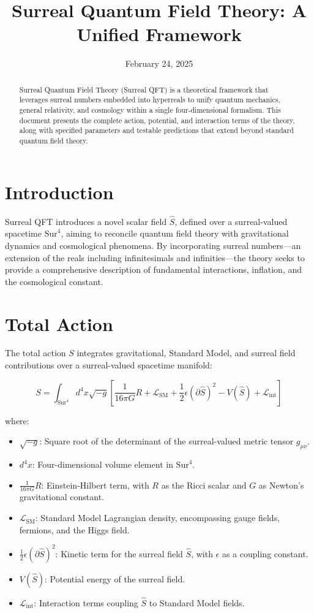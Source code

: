 \documentclass[a4paper,12pt]{article}
\title{Surreal Quantum Field Theory: A Unified Framework}
\author{}
\date{February 24, 2025}
\begin{document}
\maketitle

\begin{abstract}
    Surreal Quantum Field Theory (Surreal QFT) is a theoretical framework that leverages surreal numbers embedded into hyperreals to unify quantum mechanics, general relativity, and cosmology within a single four-dimensional formalism. This document presents the complete action, potential, and interaction terms of the theory, along with specified parameters and testable predictions that extend beyond standard quantum field theory.
\end{abstract}

\section{Introduction}
Surreal QFT introduces a novel scalar field \(\hat{S}\), defined over a surreal-valued spacetime \(\text{Sur}^4\), aiming to reconcile quantum field theory with gravitational dynamics and cosmological phenomena. By incorporating surreal numbers---an extension of the reals including infinitesimals and infinities---the theory seeks to provide a comprehensive description of fundamental interactions, inflation, and the cosmological constant.

\section{Total Action}
The total action \(S\) integrates gravitational, Standard Model, and surreal field contributions over a surreal-valued spacetime manifold:

\[
S = \int_{\text{Sur}^4} d^4x \sqrt{-g} \left[ \frac{1}{16\pi G} R + \mathcal{L}_{\text{SM}} + \frac{1}{2} \epsilon (\partial \hat{S})^2 - V(\hat{S}) + \mathcal{L}_{\text{int}} \right]
\]

where:
\begin{itemize}
    \item \(\sqrt{-g}\): Square root of the determinant of the surreal-valued metric tensor \(g_{\mu\nu}\).
    \item \(d^4x\): Four-dimensional volume element in \(\text{Sur}^4\).
    \item \(\frac{1}{16\pi G} R\): Einstein-Hilbert term, with \(R\) as the Ricci scalar and \(G\) as Newton's gravitational constant.
    \item \(\mathcal{L}_{\text{SM}}\): Standard Model Lagrangian density, encompassing gauge fields, fermions, and the Higgs field.
    \item \(\frac{1}{2} \epsilon (\partial \hat{S})^2\): Kinetic term for the surreal field \(\hat{S}\), with \(\epsilon\) as a coupling constant.
    \item \(V(\hat{S})\): Potential energy of the surreal field.
    \item \(\mathcal{L}_{\text{int}}\): Interaction terms coupling \(\hat{S}\) to Standard Model fields.
\end{itemize}
\end{document}
